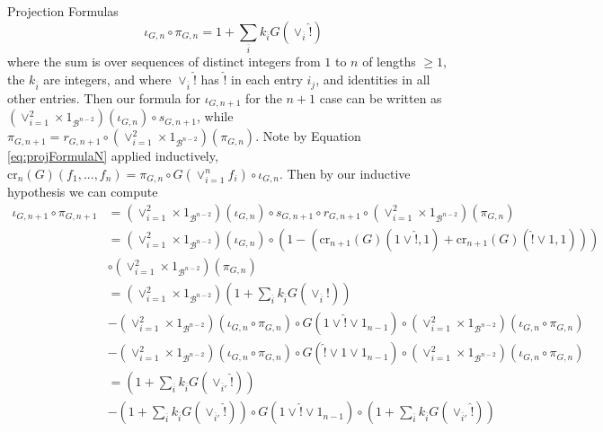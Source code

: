 \begin{rmk}{Projection Formulas}
\begin{equation*}
        \iota_{G,n}\circ \pi_{G,n} = 1 + \sum_{\overline{i}} k_{\overline{i}}G(\lor_{\overline{i}}\hat{!}) %
    \end{equation*}
    where the sum is over sequences of distinct integers from $1$ to $n$ of lengths $\geq 1$, the $k_{\overline{i}}$ are integers, and where $\lor_{\overline{i}}\hat{!}$ has $\hat{!}$ in each entry $i_j$, and identities in all other entries. Then our formula for $\iota_{G,n+1}$ for the $n+1$ case can be written as $(\lor_{i=1}^2\times 1_{\mathcal{B}^{n-2}}) (\iota_{G,n})\circ s_{G,n+1}$, while $\pi_{G,n+1} = r_{G,n+1}\circ (\lor_{i=1}^2\times 1_{\mathcal{B}^{n-2}})(\pi_{G,n})$. Note by Equation \ref{eq:projFormulaN} applied inductively, $\text{cr}_n(G)(f_1,...,f_n) = \pi_{G,n}\circ G(\lor_{i=1}^nf_i)\circ \iota_{G,n}$. Then by our inductive hypothesis we can compute
    \begin{align*}
        \iota_{G,n+1}\circ \pi_{G,n+1} &= (\lor_{i=1}^2\times 1_{\mathcal{B}^{n-2}}) (\iota_{G,n})\circ s_{G,n+1}\circ r_{G,n+1}\circ (\lor_{i=1}^2\times 1_{\mathcal{B}^{n-2}})(\pi_{G,n}) \\
        &=(\lor_{i=1}^2\times 1_{\mathcal{B}^{n-2}}) (\iota_{G,n})\circ (1-(\text{cr}_{n+1}(G)(1\lor \hat{!},1)+\text{cr}_{n+1}(G)(\hat{!}\lor 1,1)))\\
        &\circ (\lor_{i=1}^2\times 1_{\mathcal{B}^{n-2}})(\pi_{G,n}) \\
        &= \left(\lor_{i=1}^2\times 1_{\mathcal{B}^{n-2}}\right)\left(1 + \sum_{\overline{i}} k_{\overline{i}}G(\lor_{\overline{i}}\hat{!})\right) \\
        &-(\lor_{i=1}^2\times 1_{\mathcal{B}^{n-2}}) (\iota_{G,n}\circ \pi_{G,n})\circ G(1\lor \hat{!}\lor 1_{n-1})\circ (\lor_{i=1}^2\times 1_{\mathcal{B}^{n-2}}) (\iota_{G,n}\circ \pi_{G,n}) \\
        &-(\lor_{i=1}^2\times 1_{\mathcal{B}^{n-2}}) (\iota_{G,n}\circ \pi_{G,n})\circ G(\hat{!}\lor 1\lor 1_{n-1})\circ (\lor_{i=1}^2\times 1_{\mathcal{B}^{n-2}}) (\iota_{G,n}\circ \pi_{G,n}) \\
        &= \left(1 + \sum_{\overline{i}} k_{\overline{i}}G(\lor_{\overline{i}'}\hat{!})\right) \\
        &-\left(1 + \sum_{\overline{i}} k_{\overline{i}}G(\lor_{\overline{i}'}\hat{!})\right) \circ G(1\lor \hat{!}\lor 1_{n-1})\circ \left(1 + \sum_{\overline{i}} k_{\overline{i}}G(\lor_{\overline{i}'}\hat{!})\right)  \\

\end{align*}
\end{rmk}
